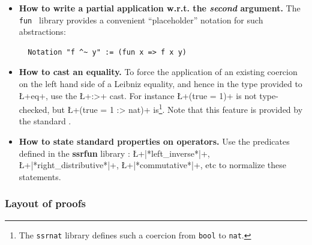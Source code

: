 \begin{itemize}
\item {\bf How to write a partial application w.r.t. the {\it second}
    argument.}
The {\tt fun } library provides a convenient ``placeholder'' notation
for such abstractions:
\begin{lstlisting}
  Notation "f ^~ y" := (fun x => f x y)
\end{lstlisting}

\item {\bf How to cast an equality.} To force the application of an
  existing coercion on the left hand side of a Leibniz equality, and
  hence in the type provided to \L+eq+, use the \L+:>+ cast. For
  instance \L+(true = 1)+ is not type-checked, but \L+(true = 1 :> nat)+
  is\footnote{The {\tt ssrnat} library defines such a coercion from
    {\tt bool} to {\tt nat}.}. Note that this feature is provided by
  the standard \Coq{}.

\item {\bf How to state standard properties on operators.} Use the
  predicates defined in the {\bf ssrfun} library :
  \L+|*left_inverse*|+, \L+|*right_distributive*|+,
  \L+|*commutative*|+, etc to normalize these statements.


\end{itemize}

\subsubsection*{Layout of proofs}

